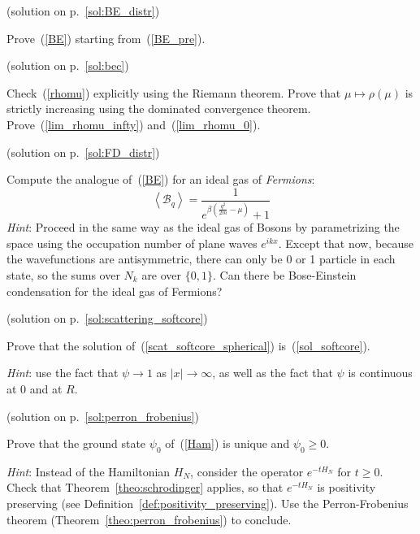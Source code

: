\documentclass{ian}
\begin{document}
\vfill
\eject

\begin{thebibliography}{WWW99}
\small
{}
\end{thebibliography}

\vfill
\eject

\exercises

\problem\label{ex:BE_distr} (solution on p.\-~\ref{sol:BE_distr})\par
\smallskip

Prove\-~(\ref{BE}) starting from\-~(\ref{BE_pre}).
\bigskip

\problem\label{ex:bec} (solution on p.\-~\ref{sol:bec})\par
\smallskip

Check\-~(\ref{rhomu}) explicitly using the Riemann theorem.
Prove that $\mu\mapsto\rho(\mu)$ is strictly increasing using the dominated convergence theorem.
Prove\-~(\ref{lim_rhomu_infty}) and\-~(\ref{lim_rhomu_0}).
\bigskip

\problem\label{ex:FD_distr} (solution on p.\-~\ref{sol:FD_distr})\par
Compute the analogue of\-~(\ref{BE}) for an ideal gas of {\it Fermions}:
\begin{equation}
  \left<\mathcal B_q\right>=
  \frac1{e^{\beta(\frac{q^2}{2m}-\mu)}+1}
  \label{FD}
\end{equation}
{\it Hint}: Proceed in the same way as the ideal gas of Bosons by parametrizing the space using the occupation number of plane waves $e^{ikx}$.
Except that now, because the wavefunctions are antisymmetric, there can only be 0 or 1 particle in each state, so the sums over $N_k$ are over $\{0,1\}$.
Can there be Bose-Einstein condensation for the ideal gas of Fermions?
\bigskip

\problem\label{ex:scattering_softcore} (solution on p.\-~\ref{sol:scattering_softcore})\par
\smallskip
Prove that the solution of\-~(\ref{scat_softcore_spherical}) is\-~(\ref{sol_softcore}).\par
{\it Hint}: use the fact that $\psi\to1$ as $|x|\to\infty$, as well as the fact that $\psi$ is continuous at $0$ and at $R$.
\bigskip

\problem\label{ex:perron_frobenius} (solution on p.\-~\ref{sol:perron_frobenius})\par
\smallskip
Prove that the ground state $\psi_0$ of\-~(\ref{Ham}) is unique and $\psi_0\geqslant 0$.\par
{\it Hint}: 
Instead of the Hamiltonian $H_N$, consider the operator $e^{-tH_N}$ for $t\geqslant0$.
Check that Theorem\-~\ref{theo:schrodinger} applies, so that $e^{-tH_N}$ is positivity preserving (see Definition\-~\ref{def:positivity_preserving}).
Use the Perron-Frobenius theorem (Theorem\-~\ref{theo:perron_frobenius}) to conclude.
\bigskip
\end{document}
